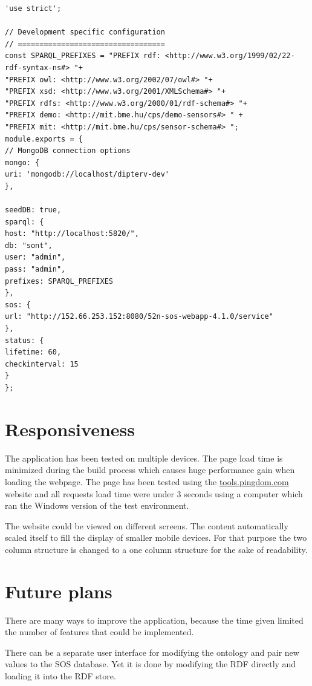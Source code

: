 \begin{lstlisting}[caption={Sample configuration for development environment\label{lst:devconf}}]
'use strict';

// Development specific configuration
// ==================================
const SPARQL_PREFIXES = "PREFIX rdf: <http://www.w3.org/1999/02/22-rdf-syntax-ns#> "+
"PREFIX owl: <http://www.w3.org/2002/07/owl#> "+
"PREFIX xsd: <http://www.w3.org/2001/XMLSchema#> "+
"PREFIX rdfs: <http://www.w3.org/2000/01/rdf-schema#> "+
"PREFIX demo: <http://mit.bme.hu/cps/demo-sensors#> " +
"PREFIX mit: <http://mit.bme.hu/cps/sensor-schema#> ";
module.exports = {
// MongoDB connection options
mongo: {
uri: 'mongodb://localhost/dipterv-dev'
},

seedDB: true,
sparql: {
host: "http://localhost:5820/",
db: "sont",
user: "admin",
pass: "admin",
prefixes: SPARQL_PREFIXES
},
sos: {
url: "http://152.66.253.152:8080/52n-sos-webapp-4.1.0/service"
},
status: {
lifetime: 60,
checkinterval: 15
}
};
\end{lstlisting}

\section{Responsiveness}

The application has been tested on multiple devices. The page load time is minimized during the build process which causes huge performance gain when loading the webpage. The page has been tested using the \url{tools.pingdom.com} website and all requests load time were under 3 seconds using a computer which ran the Windows version of the test environment. 

The website could be viewed on different screens. The content automatically scaled itself to fill the display of smaller mobile devices. For that purpose the two column structure is changed to a one column structure for the sake of readability.

\section{Future plans}

There are many ways to improve the application, because the time given limited the number of features that could be implemented. 

There can be a separate user interface for modifying the ontology and pair new values to the SOS database. Yet it is done by modifying the RDF directly and loading it into the RDF store. 

